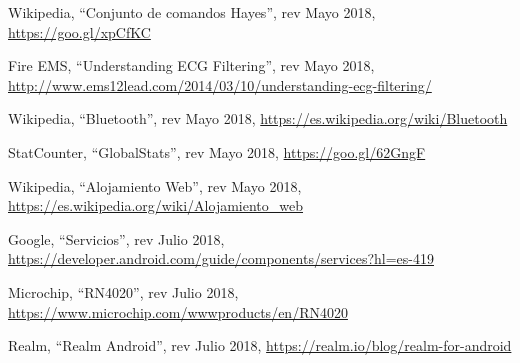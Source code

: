 \begin{thebibliography}{99}
 Wikipedia, ``Conjunto de comandos Hayes'', rev Mayo 2018, \hyperref[AT]{https://goo.gl/xpCfKC}

 Fire EMS, ``Understanding ECG Filtering'', rev Mayo 2018, \hyperref[ecg_rate]{http://www.ems12lead.com/2014/03/10/understanding-ecg-filtering/}

 Wikipedia, ``Bluetooth'', rev Mayo 2018, \hyperref[bluetooth]{https://es.wikipedia.org/wiki/Bluetooth}

 StatCounter, ``GlobalStats'', rev Mayo 2018, \hyperref[market_share_cita]{https://goo.gl/62GngF}

 Wikipedia, ``Alojamiento Web'', rev Mayo 2018, \hyperref[hosting_web]{https://es.wikipedia.org/wiki/Alojamiento\_web}

 Google, ``Servicios'', rev Julio 2018, \hyperref[services]{https://developer.android.com/guide/components/services?hl=es-419}

 Microchip, ``RN4020'', rev Julio 2018, \hyperref[RN4020_code]{https://www.microchip.com/wwwproducts/en/RN4020}

 Realm, ``Realm Android'', rev Julio 2018, \hyperref[realm_android]{https://realm.io/blog/realm-for-android}


%
%
\end{thebibliography}